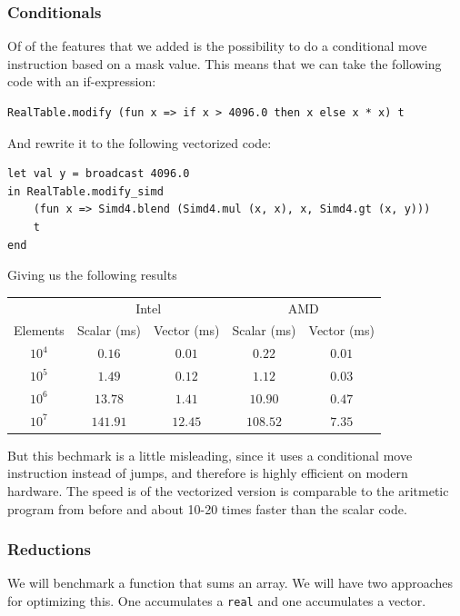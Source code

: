 \documentclass{article}
\begin{document}
\subsubsection{Conditionals}
Of of the features that we added is the possibility to do a conditional move instruction based on a mask value. This means that we can take the following code with an if-expression:
\begin{verbatim}
RealTable.modify (fun x => if x > 4096.0 then x else x * x) t
\end{verbatim}
And rewrite it to the following vectorized code:
\begin{verbatim}
let val y = broadcast 4096.0
in RealTable.modify_simd
    (fun x => Simd4.blend (Simd4.mul (x, x), x, Simd4.gt (x, y)))
    t
end
\end{verbatim}
Giving us the following results

\begin{center}
\begin{tabular}{c c c c c}
    \toprule
    & \multicolumn{2}{c}{Intel} & \multicolumn{2}{c}{AMD} \\
    Elements & Scalar (ms) & Vector (ms) & Scalar (ms) & Vector (ms) \\
    \midrule
    $10^4$ & $0.16$ & $0.01$ & $0.22$ & $0.01$ \\
    $10^5$ & $1.49$ & $0.12$ & $1.12$ & $0.03$ \\
    $10^6$ & $13.78$ & $1.41$ & $10.90$ & $0.47$ \\
    $10^7$ & $141.91$ & $12.45$ & $108.52$ & $7.35$ \\
    \bottomrule
\end{tabular}
\end{center}

But this bechmark is a little misleading, since it uses a conditional move instruction instead of jumps, and therefore is highly efficient on modern hardware. The speed is of the vectorized version is comparable to the aritmetic program from before and about 10-20 times faster than the scalar code.

\subsubsection{Reductions}

We will benchmark a function that sums an array. We will have two approaches for optimizing this. One accumulates a \verb!real! and one accumulates a vector.
\end{document}
